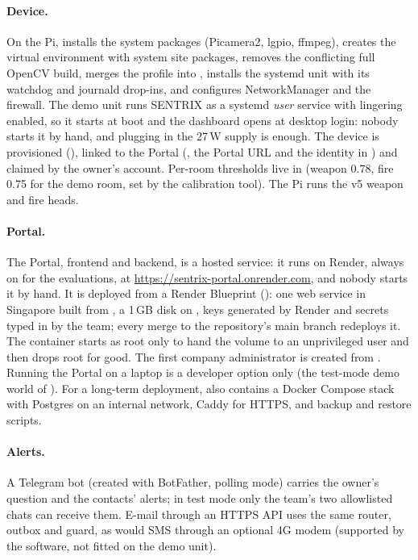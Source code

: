 \paragraph{Device.} On the Pi,  installs the system packages (Picamera2, lgpio, ffmpeg), creates the virtual environment with system site packages, removes the conflicting full OpenCV build, merges the  profile into , installs the systemd unit with its watchdog and journald drop-ins, and configures NetworkManager and the  firewall. The demo unit runs SENTRIX as a systemd \emph{user} service with lingering enabled, so it starts at boot and the dashboard opens at desktop login: nobody starts it by hand, and plugging in the 27\,W supply is enough. The device is provisioned (), linked to the Portal (, the Portal URL and the identity in ) and claimed by the owner's account. Per-room thresholds live in  (weapon 0.78, fire 0.75 for the demo room, set by the calibration tool). The Pi runs the v5 weapon and fire heads.

\paragraph{Portal.} The Portal, frontend and backend, is a hosted service: it runs on Render, always on for the evaluations, at \mbox{\url{https://sentrix-portal.onrender.com}}, and nobody starts it by hand. It is deployed from a Render Blueprint (): one web service in Singapore built from , a 1\,GB disk on , keys generated by Render and secrets typed in by the team; every merge to the repository's main branch redeploys it. The container starts as root only to hand the volume to an unprivileged user and then drops root for good. The first company administrator is created from . Running the Portal on a laptop is a developer option only (the test-mode demo world of ). For a long-term deployment,  also contains a Docker Compose stack with Postgres on an internal network, Caddy for HTTPS, and backup and restore scripts.

\paragraph{Alerts.} A Telegram bot (created with BotFather, polling mode) carries the owner's question and the contacts' alerts; in test mode only the team's two allowlisted chats can receive them. E-mail through an HTTPS API uses the same router, outbox and guard, as would SMS through an optional 4G modem (supported by the software, not fitted on the demo unit).

